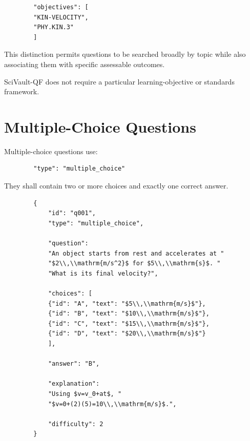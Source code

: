 \documentclass[11pt]{article}
\begin{document}
	\begin{lstlisting}
		"objectives": [
		"KIN-VELOCITY",
		"PHY.KIN.3"
		]
	\end{lstlisting}
	
	This distinction permits questions to be searched broadly by topic while
	also associating them with specific assessable outcomes.
	
	SciVault-QF does not require a particular learning-objective or standards
	framework.
	
	\section{Multiple-Choice Questions}
	
	Multiple-choice questions use:
	
	\begin{lstlisting}
		"type": "multiple_choice"
	\end{lstlisting}
	
	They shall contain two or more choices and exactly one correct answer.
	
	\begin{lstlisting}
		{
			"id": "q001",
			"type": "multiple_choice",
			
			"question":
			"An object starts from rest and accelerates at "
			"$2\\,\\mathrm{m/s^2}$ for $5\\,\\mathrm{s}$. "
			"What is its final velocity?",
			
			"choices": [
			{"id": "A", "text": "$5\\,\\mathrm{m/s}$"},
			{"id": "B", "text": "$10\\,\\mathrm{m/s}$"},
			{"id": "C", "text": "$15\\,\\mathrm{m/s}$"},
			{"id": "D", "text": "$20\\,\\mathrm{m/s}$"}
			],
			
			"answer": "B",
			
			"explanation":
			"Using $v=v_0+at$, "
			"$v=0+(2)(5)=10\\,\\mathrm{m/s}$.",
			
			"difficulty": 2
		}
	\end{lstlisting}
	
\end{document}
